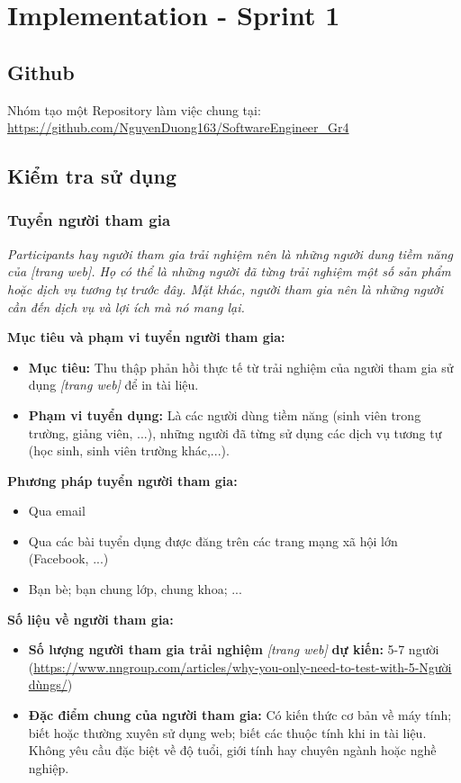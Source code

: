 \documentclass[a4paper]{article}
\begin{document}
\newpage
\section{Implementation - Sprint 1}
\subsection{Github}
\noindent Nhóm tạo một Repository làm việc chung tại: \url{https://github.com/NguyenDuong163/SoftwareEngineer_Gr4}
\subsection{Kiểm tra sử dụng}
\subsubsection{Tuyển người tham gia}
\textit{Participants hay người tham gia trải nghiệm nên là những người dung tiềm năng của [trang web]. Họ có thể là những người đã từng trải nghiệm một số sản phẩm hoặc dịch vụ tương tự trước đây. Mặt khác, người tham gia nên là những người cần đến dịch vụ và lợi ích mà nó mang lại.}

\noindent \textbf{Mục tiêu và phạm vi tuyển người tham gia:}
\begin{itemize}
  \item \textbf{Mục tiêu:} Thu thập phản hồi thực tế từ trải nghiệm của người tham gia sử dụng \textit{[trang web]} để in tài liệu.
  
  \item \textbf{Phạm vi tuyển dụng:} Là các người dùng tiềm năng (sinh viên trong trường, giảng viên, ...), những người đã từng sử dụng các dịch vụ tương tự (học sinh, sinh viên trường khác,...).
\end{itemize}

\noindent \textbf{Phương pháp tuyển người tham gia:}
\begin{itemize}
  \item Qua email
  \item Qua các bài tuyển dụng được đăng trên các trang mạng xã hội lớn (Facebook, ...)
  \item Bạn bè; bạn chung lớp, chung khoa; ...
\end{itemize}

\noindent \textbf{Số liệu về người tham gia:}
\begin{itemize}
  \item \textbf{Số lượng người tham gia trải nghiệm} \textit{[trang web]} \textbf{dự kiến:} 5-7 người (\url{https://www.nngroup.com/articles/why-you-only-need-to-test-with-5-Người dùngs/})
  
  \item \textbf{Đặc điểm chung của người tham gia:} Có kiến thức cơ bản về máy tính; biết hoặc thường xuyên sử dụng web; biết các thuộc tính khi in tài liệu. Không yêu cầu đặc biệt về độ tuổi, giới tính hay chuyên ngành hoặc nghề nghiệp.
\end{itemize}
\newpage
\end{document}
